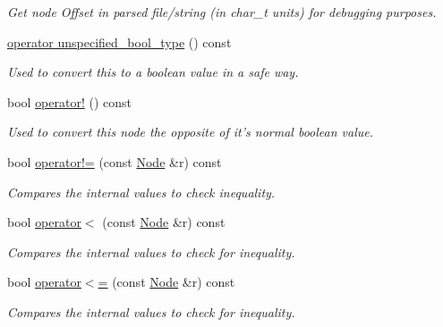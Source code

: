 \begin{DoxyCompactItemize}
\begin{DoxyCompactList}\small\item\em Get node Offset in parsed file/string (in char\_\-t units) for debugging purposes. \item\end{DoxyCompactList}\item 
\hyperlink{classphys_1_1xml_1_1Node_a29f5bb83e99bd9d09c0b78fd5a39c370}{operator unspecified\_\-bool\_\-type} () const 
\begin{DoxyCompactList}\small\item\em Used to convert this to a boolean value in a safe way. \item\end{DoxyCompactList}\item 
bool \hyperlink{classphys_1_1xml_1_1Node_a11c8e41002682a2742bd168a9318b6e8}{operator!} () const 
\begin{DoxyCompactList}\small\item\em Used to convert this node the opposite of it's normal boolean value. \item\end{DoxyCompactList}\item 
bool \hyperlink{classphys_1_1xml_1_1Node_a2fdcc611f72c98bc18ef25c9be5dc8ef}{operator!=} (const \hyperlink{classphys_1_1xml_1_1Node}{Node} \&r) const 
\begin{DoxyCompactList}\small\item\em Compares the internal values to check inequality. \item\end{DoxyCompactList}\item 
bool \hyperlink{classphys_1_1xml_1_1Node_a509304b9bcc6e7891c6b4daa16168f94}{operator$<$} (const \hyperlink{classphys_1_1xml_1_1Node}{Node} \&r) const 
\begin{DoxyCompactList}\small\item\em Compares the internal values to check for inequality. \item\end{DoxyCompactList}\item 
bool \hyperlink{classphys_1_1xml_1_1Node_a01986a425fb67bb6157aea7f861f8729}{operator$<$=} (const \hyperlink{classphys_1_1xml_1_1Node}{Node} \&r) const 
\begin{DoxyCompactList}\small\item\em Compares the internal values to check for inequality. \item\end{DoxyCompactList}\item 

\end{DoxyCompactItemize}
